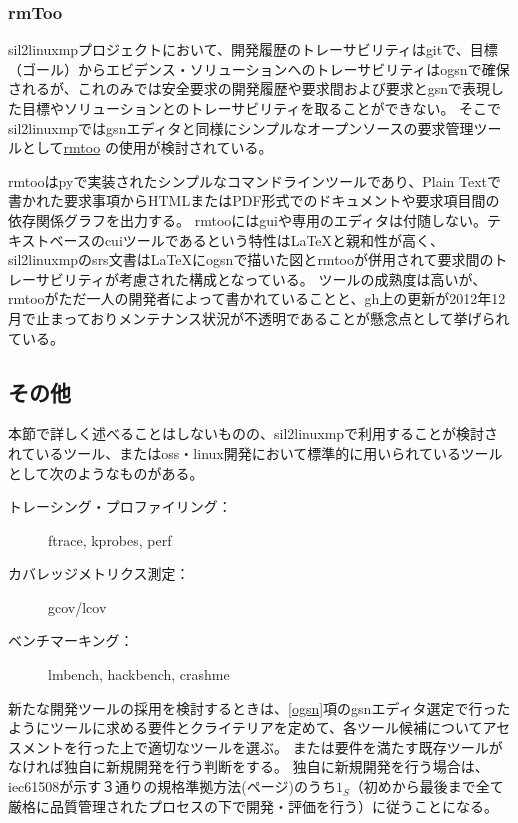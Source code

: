 \subsubsection{rmToo}
\acrshort{sil2linuxmp}プロジェクトにおいて、開発履歴のトレーサビリティは\acrshort{git}で、目標（ゴール）からエビデンス・ソリューションへのトレーサビリティは\acrshort{ogsn}で確保されるが、これのみでは安全要求の開発履歴や要求間および要求と\acrshort{gsn}で表現した目標やソリューションとのトレーサビリティを取ることができない。
そこで\acrshort{sil2linuxmp}では\acrshort{gsn}エディタと同様にシンプルなオープンソースの要求管理ツールとして\href{http://rmtoo.florath.net}{\gls{rmtoo}} \cite{rmtoo}の使用が検討されている。
\par
\acrshort{rmtoo}は\acrshort{py}で実装されたシンプルなコマンドラインツールであり、Plain Textで書かれた要求事項からHTMLまたはPDF形式でのドキュメントや要求項目間の依存関係グラフを出力する。
\acrshort{rmtoo}には\acrshort{gui}や専用のエディタは付随しない。テキストベースの\acrshort{cui}ツールであるという特性は\LaTeX{}と親和性が高く、\acrshort{sil2linuxmp}の\gls{srs}文書は\LaTeX{}に\acrshort{ogsn}で描いた図と\acrshort{rmtoo}が併用されて要求間のトレーサビリティが考慮された構成となっている。
ツールの成熟度は高いが、\acrshort{rmtoo}がただ一人の開発者によって書かれていることと、\acrshort{gh}上の更新が2012年12月で止まっておりメンテナンス状況が不透明であることが懸念点として挙げられている。
\subsection{その他}
本節で詳しく述べることはしないものの、\acrshort{sil2linuxmp}で利用することが検討されているツール、または\acrshort{oss}・\acrshort{linux}開発において標準的に用いられているツールとして次のようなものがある。
\begin{description}
  \item[トレーシング・プロファイリング：]ftrace, kprobes, perf
  \item[カバレッジメトリクス測定：]gcov/lcov
  \item[ベンチマーキング：]lmbench, hackbench, crashme
\end{description}
\par
新たな開発ツールの採用を検討するときは、\ref{ogsn}項の\acrshort{gsn}エディタ選定で行ったようにツールに求める要件とクライテリアを定めて、各ツール候補についてアセスメントを行った上で適切なツールを選ぶ。
または要件を満たす既存ツールがなければ独自に新規開発を行う判断をする。
独自に新規開発を行う場合は、\acrshort{iec61508}が示す３通りの規格準拠方法(\pageref{3route}ページ)のうち$1_S$（初めから最後まで全て厳格に品質管理されたプロセスの下で開発・評価を行う）に従うことになる。
\newpage
